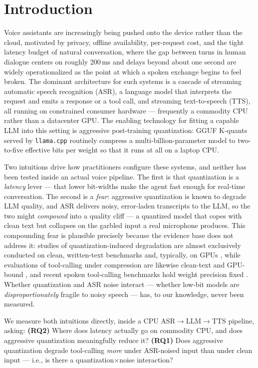 \documentclass[11pt]{article}
\newcommand{\code}[1]{\texttt{#1}}
\begin{document}
\section{Introduction}
Voice assistants are increasingly being pushed onto the device rather than the cloud,
motivated by privacy, offline availability, per-request cost, and the tight latency
budget of natural conversation, where the gap between turns in human dialogue centers
on roughly 200\,ms \citep{stivers2009} and delays beyond about one second are widely
operationalized as the point at which a spoken exchange begins to feel broken. The
dominant architecture for such systems is a cascade of streaming automatic speech
recognition (ASR), a language model that interprets the request and emits a response
or a tool call, and streaming text-to-speech (TTS), all running on constrained
consumer hardware --- frequently a commodity CPU rather than a datacenter GPU. The
enabling technology for fitting a capable LLM into this setting is aggressive
post-training quantization: GGUF K-quants served by \code{llama.cpp} routinely
compress a multi-billion-parameter model to two-to-five effective bits per weight so
that it runs at all on a laptop CPU.

Two intuitions drive how practitioners configure these systems, and neither has been
tested inside an actual voice pipeline. The first is that quantization is a
\emph{latency} lever --- that lower bit-widths make the agent fast enough for
real-time conversation. The second is a \emph{fear}: aggressive quantization is known
to degrade LLM quality, and ASR delivers noisy, error-laden transcripts to the LLM,
so the two might \emph{compound} into a quality cliff --- a quantized model that copes
with clean text but collapses on the garbled input a real microphone produces. This
compounding fear is plausible precisely because the evidence base does not address it:
studies of quantization-induced degradation are almost exclusively conducted on clean,
written-text benchmarks and, typically, on GPUs \citep{lee2024,dutta2024,song2025},
while evaluations of tool-calling under compression are likewise clean-text and
GPU-bound \citep{dong2025,jang2026}, and recent spoken tool-calling benchmarks hold
weight precision fixed \citep{laskar2026,peng2026}. Whether quantization and ASR noise
interact --- whether low-bit models are \emph{disproportionately} fragile to noisy
speech --- has, to our knowledge, never been measured.

We measure both intuitions directly, inside a CPU ASR$\rightarrow$LLM$\rightarrow$TTS
pipeline, asking: \textbf{(RQ2)} Where does latency actually go on commodity CPU, and
does aggressive quantization meaningfully reduce it? \textbf{(RQ1)} Does aggressive
quantization degrade tool-calling \emph{more} under ASR-noised input than under clean
input --- i.e., is there a quantization$\times$noise interaction?
\end{document}
